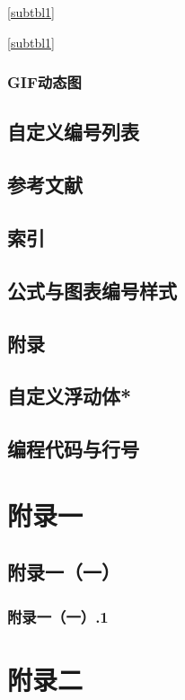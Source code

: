 \documentclass[twoside]{ctexart}
\begin{document}
            \thesubtable\par
            \ref{subtbl1}\par
            \autoref{subtbl1}
            
        \subsubsection{GIF动态图}
    \subsection{自定义编号列表}
            
    \subsection{参考文献}

    \subsection{索引}

    \subsection{公式与图表编号样式}
    \subsection{附录}
    \subsection{自定义浮动体*}
    \subsection{编程代码与行号}

\theendnotes


\begin{appendices}
    \section{附录一}
        \subsection{附录一（一）}
            \subsubsection{附录一（一）.1}
    \section{附录二}
\end{appendices}
\end{document}
